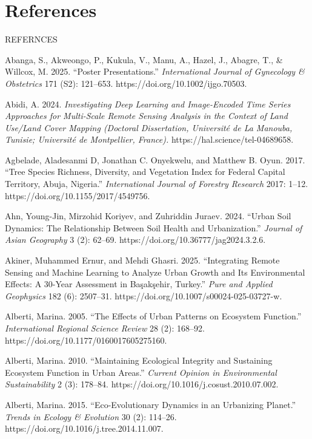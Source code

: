 \chapter*{References}
\label{ch:references}

{}REFERNCES

Abanga, S., Akweongo, P., Kukula, V., Manu, A., Hazel, J., Abagre, T., \& Willcox, M. 2025. ``Poster Presentations.'' \emph{International Journal of Gynecology \& Obstetrics} 171 (S2): 121--653. https://doi.org/10.1002/ijgo.70503.

Abidi, A. 2024. \emph{Investigating Deep Learning and Image-Encoded Time Series Approaches for Multi-Scale Remote Sensing Analysis in the Context of Land Use/Land Cover Mapping (Doctoral Dissertation, Université de La Manouba, Tunisie; Université de Montpellier, France).} https://hal.science/tel-04689658.

Agbelade, Aladesanmi D, Jonathan C. Onyekwelu, and Matthew B. Oyun. 2017. ``Tree Species Richness, Diversity, and Vegetation Index for Federal Capital Territory, Abuja, Nigeria.'' \emph{International Journal of Forestry Research} 2017: 1--12. https://doi.org/10.1155/2017/4549756.

Ahn, Young-Jin, Mirzohid Koriyev, and Zuhriddin Juraev. 2024. ``Urban Soil Dynamics: The Relationship Between Soil Health and Urbanization.'' \emph{Journal of Asian Geography} 3 (2): 62--69. https://doi.org/10.36777/jag2024.3.2.6.

Akiner, Muhammed Ernur, and Mehdi Ghasri. 2025. ``Integrating Remote Sensing and Machine Learning to Analyze Urban Growth and Its Environmental Effects: A 30-Year Assessment in Başakşehir, Turkey.'' \emph{Pure and Applied Geophysics} 182 (6): 2507--31. https://doi.org/10.1007/s00024-025-03727-w.

Alberti, Marina. 2005. ``The Effects of Urban Patterns on Ecosystem Function.'' \emph{International Regional Science Review} 28 (2): 168--92. https://doi.org/10.1177/0160017605275160.

Alberti, Marina. 2010. ``Maintaining Ecological Integrity and Sustaining Ecosystem Function in Urban Areas.'' \emph{Current Opinion in Environmental Sustainability} 2 (3): 178--84. https://doi.org/10.1016/j.cosust.2010.07.002.

Alberti, Marina. 2015. ``Eco-Evolutionary Dynamics in an Urbanizing Planet.'' \emph{Trends in Ecology \& Evolution} 30 (2): 114--26. https://doi.org/10.1016/j.tree.2014.11.007.

